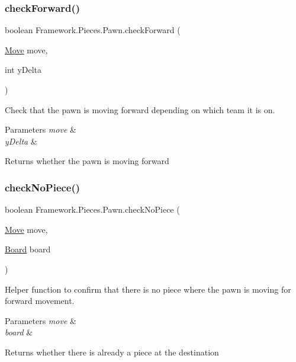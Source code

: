 \subsubsection{\texorpdfstring{check\+Forward()}{checkForward()}}
{\footnotesize\ttfamily boolean Framework.\+Pieces.\+Pawn.\+check\+Forward (\begin{DoxyParamCaption}\item[{\hyperlink{class_framework_1_1_move}{Move}}]{move,  }\item[{int}]{y\+Delta }\end{DoxyParamCaption})}

Check that the pawn is moving forward depending on which team it is on. 
\begin{DoxyParams}{Parameters}
{\em move} & \\
\hline
{\em y\+Delta} & \\
\hline
\end{DoxyParams}
\begin{DoxyReturn}{Returns}
whether the pawn is moving forward 
\end{DoxyReturn}
\hypertarget{class_framework_1_1_pieces_1_1_pawn_ac1d28a30f35296bc46384a28ba46f48d}{}\label{class_framework_1_1_pieces_1_1_pawn_ac1d28a30f35296bc46384a28ba46f48d} 
\subsubsection{\texorpdfstring{check\+No\+Piece()}{checkNoPiece()}}
{\footnotesize\ttfamily boolean Framework.\+Pieces.\+Pawn.\+check\+No\+Piece (\begin{DoxyParamCaption}\item[{\hyperlink{class_framework_1_1_move}{Move}}]{move,  }\item[{\hyperlink{class_framework_1_1_board}{Board}}]{board }\end{DoxyParamCaption})}

Helper function to confirm that there is no piece where the pawn is moving for forward movement. 
\begin{DoxyParams}{Parameters}
{\em move} & \\
\hline
{\em board} & \\
\hline
\end{DoxyParams}
\begin{DoxyReturn}{Returns}
whether there is already a piece at the destination 
\end{DoxyReturn}
\hypertarget{class_framework_1_1_pieces_1_1_pawn_aefb4da1ff1fe2d9bb73f3260be89ebae}{}\label{class_framework_1_1_pieces_1_1_pawn_aefb4da1ff1fe2d9bb73f3260be89ebae} 
